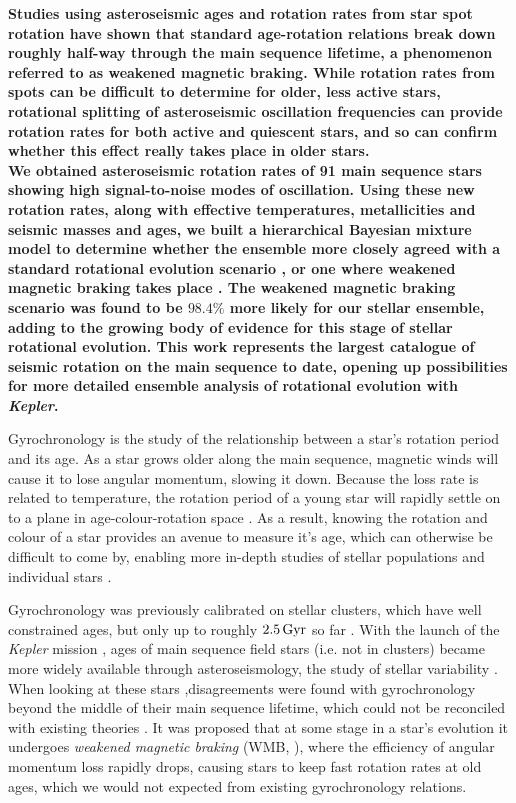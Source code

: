\documentclass[12pt]{article}
\begin{document}
\textbf{Studies using asteroseismic ages and rotation rates from star spot rotation have shown that standard age-rotation relations break down roughly half-way through the main sequence lifetime, a phenomenon referred to as weakened magnetic braking. While rotation rates from spots can be difficult to determine for older, less active stars, rotational splitting of asteroseismic oscillation frequencies can provide rotation rates for both active and quiescent stars, and so can confirm whether this effect really takes place in older stars.\\
We obtained asteroseismic rotation rates of 91 main sequence stars showing high signal-to-noise modes of oscillation.
Using these new rotation rates, along with effective temperatures, metallicities and seismic masses and ages, we built a hierarchical Bayesian mixture model to determine whether the ensemble more closely agreed with a standard rotational evolution scenario \cite{vansaders+pinsonneault2013}, or one where weakened magnetic braking takes place \cite{vansaders+2016}. The weakened magnetic braking scenario was found to be $98.4\%$ more likely for our stellar ensemble, adding to the growing body of evidence for this stage of stellar rotational evolution. This work represents the largest catalogue of seismic rotation on the main sequence to date, opening up possibilities for more detailed ensemble analysis of rotational evolution with \textit{Kepler}.}

Gyrochronology is the study of the relationship between a star's rotation period and its age. As a star grows older along the main sequence, magnetic winds will cause it to lose angular momentum, slowing it down. Because the loss rate is related to temperature, the rotation period of a young star will rapidly settle on to a plane in age-colour-rotation space \cite{barnes2007}. As a result, knowing the rotation and colour of a star provides an avenue to measure it's age, which can otherwise be difficult to come by, enabling more in-depth studies of stellar populations and individual stars \cite{leiner+2019,claytor+2019}.

Gyrochronology was previously calibrated on stellar clusters, which have well constrained ages, but only up to roughly $2.5\, \rm{Gyr}$ so far \cite{meibom+2015}. With the launch of the \textit{Kepler} mission \cite{borucki+2010}, ages of main sequence field stars (i.e. not in clusters) became more widely available through asteroseismology, the study of stellar variability \cite{silvaaguirre+2015}. When looking at these stars ,disagreements were found with gyrochronology beyond the middle of their main sequence lifetime, which could not be reconciled with existing theories \cite{angus+2015, nielsen+2015, davies+2015}. It was proposed that at some stage in a star's evolution it undergoes \textit{weakened magnetic braking} (WMB, \cite{vansaders+2016}), where the efficiency of angular momentum loss rapidly drops, causing stars to keep fast rotation rates at old ages, which we would not expected from existing gyrochronology relations.
\end{document}
